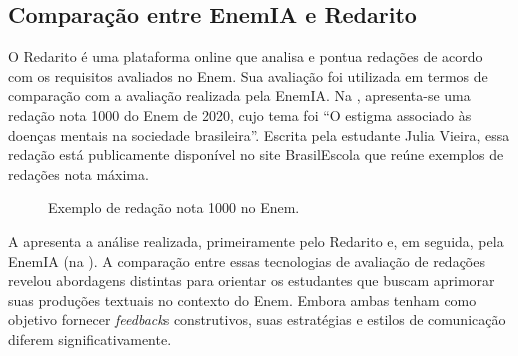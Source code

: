 \documentclass[portuguese]{textolivre}
\begin{document}
\subsection{\textbf{Comparação entre EnemIA e Redarito}}\label{comparacao}

O Redarito é uma plataforma online que analisa e pontua redações de acordo com os requisitos avaliados no Enem. Sua avaliação foi utilizada em termos de comparação com a avaliação realizada pela EnemIA. Na , apresenta-se uma redação nota 1000 do Enem de 2020, cujo tema foi “O estigma associado às doenças mentais na sociedade brasileira”. Escrita pela estudante Julia Vieira, essa redação está publicamente disponível no site BrasilEscola que reúne exemplos de redações nota máxima.

\begin{figure}[htbp]
\centering
\begin{minipage}{\textwidth}
 \caption{Exemplo de redação nota 1000 no Enem.}
 \label{fig02}
\end{minipage}
\end{figure}

A  apresenta a análise realizada, primeiramente pelo Redarito e, em seguida, pela EnemIA (na ). A comparação entre essas tecnologias de avaliação de redações revelou abordagens distintas para orientar os estudantes que buscam aprimorar suas produções textuais no contexto do Enem. Embora ambas tenham como objetivo fornecer \textit{feedback}s construtivos, suas estratégias e estilos de comunicação diferem significativamente.
\end{document}
